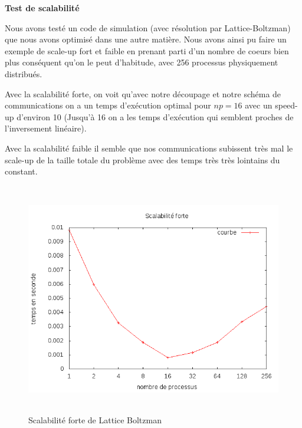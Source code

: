 


{\bf Test de scalabilité}

Nous avons testé un code de simulation
(avec résolution par Lattice-Boltzman)
que nous avons optimisé dans une autre matière.
Nous avons ainsi pu faire un exemple de scale-up
fort et faible en prenant parti d'un nombre de coeurs
bien plus conséquent qu'on le peut d'habitude,
avec 256 processus physiquement distribués.

Avec la scalabilité forte, on voit qu'avec
notre découpage et notre schéma de communications
on a un temps d'exécution optimal pour $np = 16$
avec un speed-up d'environ 10
(Jusqu'à 16 on a les temps d'exécution qui semblent
proches de l'inversement linéaire).

Avec la scalabilité faible il semble que nos
communications subissent très mal le scale-up de la taille
totale du problème avec des temps très très lointains du
constant.

\begin{figure}
\begin{center}
\includegraphics[height=4in]{cr/scalabilite_forte}
\caption{Scalabilité forte de Lattice Boltzman}
\end{center}
\end{figure}

